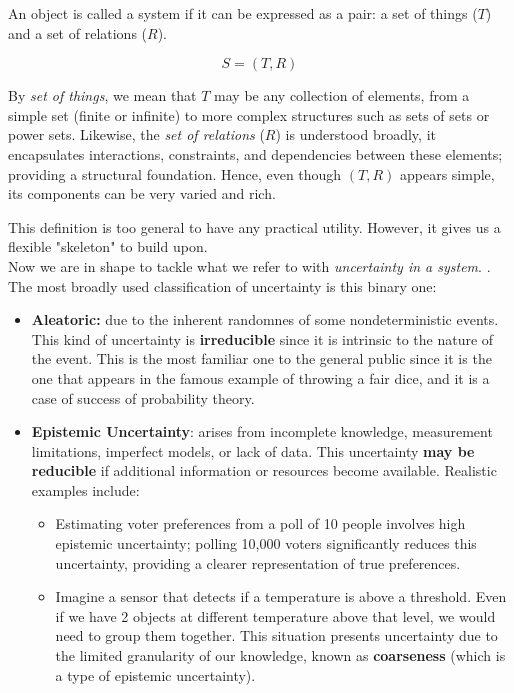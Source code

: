 \begin{definition}[System]
    An object is called a system if it can be expressed as a pair: a set of things ($T$) and a set of relations ($R$).

    \[S = (T,R)\]
\end{definition}

\begin{remark}
    By \emph{set of things}, we mean that \(T\) may be any collection of elements, from a simple set (finite or infinite) to more complex structures such as sets of sets or power sets. Likewise, the \emph{set of relations} (\(R\)) is understood broadly, it encapsulates interactions, constraints, and dependencies between these elements; providing a structural foundation. Hence, even though \((T, R)\) appears simple, its components can be very varied and rich.
\end{remark}

This definition is too general to have any practical utility. However, it gives us a flexible "skeleton" to build upon.\\

Now we are in shape to tackle what we refer to with \textit{uncertainty in a system}. \cite{UncertaintySciences}. The most broadly used classification of uncertainty is this binary one:\\

\begin{itemize}
    \item \textbf{Aleatoric:} due to the inherent randomnes of some nondeterministic events. This kind of uncertainty is \textbf{irreducible} since it is intrinsic to the nature of the event. This is the most familiar one to the general public since it is the one that appears in the famous example of throwing a fair dice, and it is a case of success of probability theory.
    \item \textbf{Epistemic Uncertainty}: arises from incomplete knowledge, measurement limitations, imperfect models, or lack of data. This uncertainty \textbf{may be reducible} if additional information or resources become available. Realistic examples include: 
    \begin{itemize} 
        \item Estimating voter preferences from a poll of 10 people involves high epistemic uncertainty; polling 10,000 voters significantly reduces this uncertainty, providing a clearer representation of true preferences. 
        \item Imagine a sensor that detects if a temperature is above a threshold. Even if we have 2 objects at different temperature above that level, we would need to group them together. This situation presents uncertainty due to the limited granularity of our knowledge, known as \textbf{coarseness} (which is a type of epistemic uncertainty).
    \end{itemize} 
\end{itemize}

